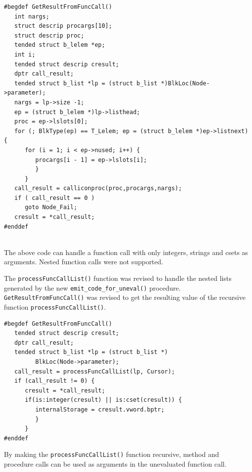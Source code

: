 \documentclass{article}
\begin{document}
\begin{verbatim}
#begdef GetResultFromFuncCall()
   int nargs;
   struct descrip procargs[10];
   struct descrip proc;
   tended struct b_lelem *ep;
   int i;
   tended struct descrip cresult;
   dptr call_result;
   tended struct b_list *lp = (struct b_list *)BlkLoc(Node->parameter);
   nargs = lp->size -1;
   ep = (struct b_lelem *)lp->listhead;
   proc = ep->lslots[0];
   for (; BlkType(ep) == T_Lelem; ep = (struct b_lelem *)ep->listnext) {
      for (i = 1; i < ep->nused; i++) {
         procargs[i - 1] = ep->lslots[i];
         }
      }
   call_result = calliconproc(proc,procargs,nargs);
   if ( call_result == 0 )
      goto Node_Fail;
   cresult = *call_result;
#enddef


\end{verbatim}
The above code can handle a function call with only integers, strings and csets as arguments.  Nested function calls were not supported. 

The \texttt{processFuncCallList()} function was revised to handle the nested lists generated by the new \texttt{emit\_code\_for\_uneval()} procedure.  \texttt{GetResultFromFuncCall()} was revised to get the resulting value of the recursive function \texttt{processFuncCallList()}.\\ 
\begin{verbatim}
#begdef GetResultFromFuncCall()
   tended struct descrip cresult;
   dptr call_result;
   tended struct b_list *lp = (struct b_list *)
         BlkLoc(Node->parameter);
   call_result = processFuncCallList(lp, Cursor);
   if (call_result != 0) {
      cresult = *call_result;
      if(is:integer(cresult) || is:cset(cresult)) {
         internalStorage = cresult.vword.bptr;
         }
      }
#enddef
\end{verbatim}
By making the \texttt{processFuncCallList()} function recursive, method and procedure calls can be used as arguments in the unevaluated function call.\\
\end{document}
